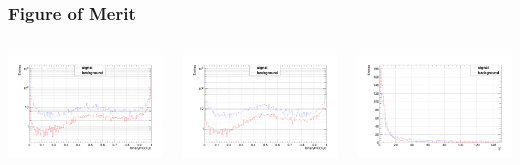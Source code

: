 \documentclass[aspectratio=169]{ctexbeamer}
\begin{document}
\begin{frame}
  \frametitle{Figure of Merit}
  \begin{columns}
    \begin{column}{0.33\textwidth}
      \centering
      \includegraphics[width=\textwidth]{figures/binaryPID_phikp.png}
    \end{column}
    \begin{column}{0.33\textwidth}
      \centering
      \includegraphics[width=\textwidth]{figures/binaryPID_eekp.png}
    \end{column}
    \begin{column}{0.33\textwidth}
      \centering
      \includegraphics[width=\textwidth]{figures/chisq.png}
    \end{column}
  \end{columns}


\end{frame}
\end{document}
